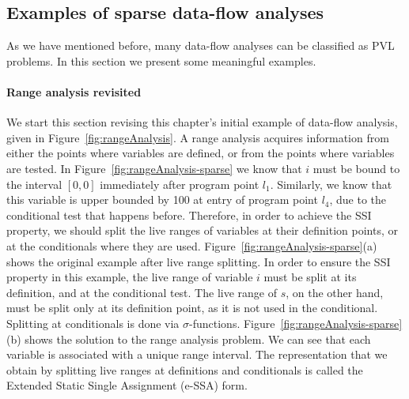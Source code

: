 \subsection{Examples of sparse data-flow analyses}
\label{sub:examples}

As we have mentioned before, many data-flow analyses can be classified as PVL problems.
In this section we present some meaningful examples.

\paragraph{Range analysis revisited}
We start this section revising this chapter's initial example of data-flow analysis, given in Figure~\ref{fig:rangeAnalysis}.
A range analysis acquires information from either the points where variables are defined, or from the points where variables are tested.
In Figure~\ref{fig:rangeAnalysis-sparse} we know that $i$ must be bound to the interval $[0, 0]$ immediately after program point $l_1$.
Similarly, we know that this variable is upper bounded by 100 at entry of program point $l_4$, due to the conditional test that happens before.
Therefore, in order to achieve the SSI property, we should split the live ranges of variables at their definition points, or at the conditionals where they are used.
Figure~\ref{fig:rangeAnalysis-sparse}(a) shows the original example after live range splitting.
In order to ensure the SSI property in this example, the live range of variable $i$ must be split at its definition, and at the conditional test.
The live range of $s$, on the other hand, must be split only at its definition point, as it is not used in the conditional.
Splitting at conditionals is done via $\sigma$-functions.
Figure~\ref{fig:rangeAnalysis-sparse}(b) shows the solution to the range analysis problem.
We can see that each variable is associated with a unique range interval.
The representation that we obtain by splitting live ranges at definitions and conditionals is called the Extended Static Single Assignment (e-SSA) form.

